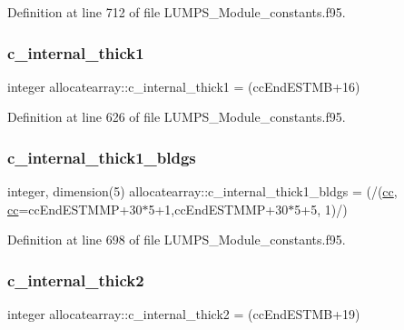 Definition at line 712 of file L\+U\+M\+P\+S\+\_\+\+Module\+\_\+constants.\+f95.

\mbox{\label{namespaceallocatearray_ac1b54a91457a92d6eb98b0ef303110b1}} 
\subsubsection{\texorpdfstring{c\+\_\+internal\+\_\+thick1}{c\_internal\_thick1}}
{\footnotesize\ttfamily integer allocatearray\+::c\+\_\+internal\+\_\+thick1 = (cc\+End\+E\+S\+T\+MB+16)}



Definition at line 626 of file L\+U\+M\+P\+S\+\_\+\+Module\+\_\+constants.\+f95.

\mbox{\label{namespaceallocatearray_a36130c9abba030f79380a76d8a252f2a}} 
\subsubsection{\texorpdfstring{c\+\_\+internal\+\_\+thick1\+\_\+bldgs}{c\_internal\_thick1\_bldgs}}
{\footnotesize\ttfamily integer, dimension(5) allocatearray\+::c\+\_\+internal\+\_\+thick1\+\_\+bldgs = (/(\hyperlink{namespaceallocatearray_ac863c81704eb507dee10f5e10741e10c}{cc}, \hyperlink{namespaceallocatearray_ac863c81704eb507dee10f5e10741e10c}{cc}=cc\+End\+E\+S\+T\+M\+MP+30$\ast$5+1,cc\+End\+E\+S\+T\+M\+MP+30$\ast$5+5, 1)/)}



Definition at line 698 of file L\+U\+M\+P\+S\+\_\+\+Module\+\_\+constants.\+f95.

\mbox{\label{namespaceallocatearray_a025160042f9583347ec34744280846ef}} 
\subsubsection{\texorpdfstring{c\+\_\+internal\+\_\+thick2}{c\_internal\_thick2}}
{\footnotesize\ttfamily integer allocatearray\+::c\+\_\+internal\+\_\+thick2 = (cc\+End\+E\+S\+T\+MB+19)}



